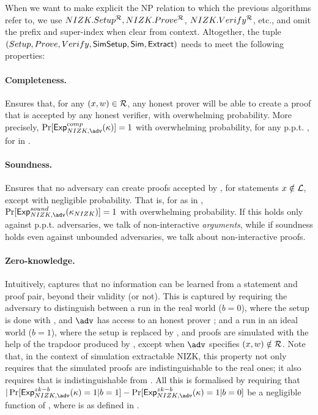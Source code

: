 When we want to make explicit the NP relation \NIZKRel to which the previous
algorithms refer to, we use $NIZK.Setup^\mathcal{R},NIZK.Prove^\mathcal{R}$, 
$NIZK.Verify^\mathcal{R}$, etc., and omit the \NIZK prefix and super-index when
clear from context. Altogether, the tuple $(Setup,Prove,Verify,
\mathsf{\mathsf{SimSetup}},\mathsf{Sim},\mathsf{Extract})$ needs to meet the following
properties:

\paragraph{Completeness.} %
Ensures that, for any $(x,w) \in \mathcal{R}$, any honest prover will be
able to create a proof \NIZKproof that is accepted by any honest verifier, with
overwhelming probability. More precisely, $\Pr\lbrack\ExpNIZKComp(\secpar)
\rbrack = 1$ with overwhelming probability, for any p.p.t. \adv, for
\ExpNIZKComp in .

\paragraph{Soundness.} %
Ensures that no adversary can create proofs accepted by \Verify, for
statements $x \notin \mathcal{L}$, except with negligible probability. That
is, for \ExpNIZKSound as in , $\Pr\lbrack\ExpNIZKSound
(\NIZKsecpar)\rbrack=1$ with overwhelming probability. If this holds only
against p.p.t. adversaries, we talk of non-interactive \emph{arguments}, while
if soundness holds even against unbounded adversaries, we talk about
non-interactive proofs.

\paragraph{Zero-knowledge.} %
Intuitively, captures that no information can be learned from a statement and
proof pair, beyond their validity (or not). This is captured by requiring the
adversary to distinguish between a run in the real world ($b=0$), where the
setup is done with \Setup, and $\adv$ has access to an honest prover
\Prove; and a run in an ideal world ($b=1$), where the setup is replaced by
\SimSetup, and proofs are simulated with the help of the trapdoor produced by
\SimSetup, except when $\adv$ specifies $(x,w) \notin \mathcal{R}$. Note
that, in the context of simulation extractable NIZK, this property not only
requires that the simulated proofs are indistinguishable to the real ones; it
also requires that \SimSetup is indistinguishable from \Setup. All this is
formalised by requiring that $|\Pr[\ExpNIZKZKb(\secpar) = 1 | b = 1] -
\Pr[\ExpNIZKZKb(\secpar) = 1 | b = 0]$ be a negligible function of \secpar,
where \ExpNIZKZKb is as defined in .

